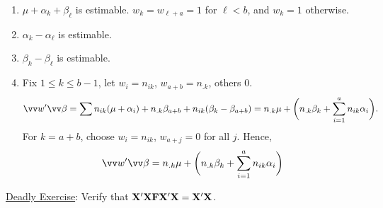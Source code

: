 \begin{enumerate}[(1)]
    \item $ \mu+\alpha_k+\beta_\ell $ is estimable. $ w_k=w_{\ell+a}=1 $ for $ \ell<b $, and $ w_k=1 $ otherwise.
    \item $ \alpha_k-\alpha_\ell $ is estimable.
    \item $ \beta_k-\beta_\ell $ is estimable.
    \item Fix $ 1\le k\le b-1 $, let $ w_i=n_{ik} $, $ w_{a+b}=n_{.k} $, others $ 0 $.
          \[ \Vector{w}'\Vector{\beta}=\sum n_{ik}(\mu+\alpha_i)+n_{.k}\beta_{a+b}+n_{ik}(\beta_k-\beta_{a+b})=n_{.k}\mu+\biggl(n_{.k}\beta_k+\sum_{i=1}^{a}n_{ik}\alpha_i\biggr). \]
          For $ k=a+b $, choose $ w_i=n_{ik} $, $ w_{a+j}=0 $ for all $ j $. Hence,
          \[ \Vector{w}'\Vector{\beta}=n_{.k}\mu+\biggl(n_{.k}\beta_k+\sum_{i=1}^{a}n_{ik}\alpha_i\biggr) \]
\end{enumerate}
\underline{Deadly Exercise}: Verify that $ \mathbf{X}'\mathbf{X}\mathbf{F}\mathbf{X}'\mathbf{X}=\mathbf{X}'\mathbf{X} $.